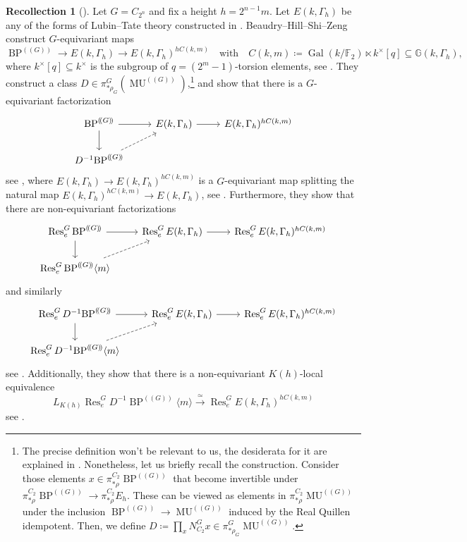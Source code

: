 \documentclass[a4paper, 10pt]{article}
\newcommand{\F}{\mathbb F}
\newcommand{\MU}{\operatorname{MU}}
\newcommand{\MUG}{{\MU^{(\!(G)\!)}}}
\newcommand{\BPG}{{\BP^{(\!(G)\!)}}}
\newcommand{\BPGm}{{\BP^{(\!(G)\!)}}\langle m\rangle}
\newcommand{\BP}{\operatorname{BP}}
\newcommand{\Res}{\operatorname{Res}}
\theoremstyle{definition}
\newtheorem{recollection}[recollection]{Recollection}
\begin{document}
\begin{recollection}[{\cite{beaudryHillShiZeng2021modelsLubinTate}}] \label{recollection: bhsz}
    Let \(G=C_{2^n}\) and fix a height \(h=2^{n-1}m\).
    Let \(E(k,\Gamma_h)\) be any of the forms of Lubin--Tate theory constructed in \cite[Theorem 1.5]{beaudryHillShiZeng2021modelsLubinTate}.
    Beaudry--Hill--Shi--Zeng construct \(G\)-equivariant maps
    \[\BPG\longrightarrow E(k,\Gamma_h)\longrightarrow E(k,\Gamma_h)^{hC(k,m)} \quad \text{with} \quad C(k,m) \coloneqq \operatorname{Gal}(k/\F_2) \ltimes k^\times [q] \subseteq \mathbb{G}(k, \Gamma_h),
    \]
    where $k^{\times}[q] \subseteq k^{\times}$ is the subgroup of $q = (2^m-1)$-torsion elements, see \cite[Remark 6.1]{beaudryHillShiZeng2021modelsLubinTate}.
    They construct a class \(D\in \pi^{G}_{*\rho_G}(\MUG)\),\footnote{The precise definition won't be relevant to us, the desiderata for it are explained in \cite[Section 6]{beaudryHillShiZeng2021modelsLubinTate}. Nonetheless, let us briefly recall the construction. Consider those elements $x \in \pi_{*\rho}^{C_2} \BPG$ that become invertible under $\pi_{*\rho}^{C_2}\BPG \to \pi_{*\rho}^{C_2} E_h$. These can be viewed as elements in $\pi_{*\rho}^{C_2} \MUG$ under the inclusion $\BPG \to \MUG$ induced by the Real Quillen idempotent. Then, we define $D \coloneqq \prod_x N_{C_2}^G x \in \pi_{*\rho_G}^G \MUG$.} and show that there is a
    \(G\)-equivariant factorization
    \[
    \begin{tikzcd}
        \BPG \ar[r]\ar[d] & E(k,\Gamma_h) \ar[r] & E(k,\Gamma_h)^{hC(k,m)} \\
        D^{-1}\BPG \ar[ru, dashed]
    \end{tikzcd}
    \]
    see \cite[Theorem 1.8]{beaudryHillShiZeng2021modelsLubinTate}, where $E(k,\Gamma_h) \to E(k,\Gamma_h)^{hC(k,m)}$ is a $G$-equivariant map splitting the natural map $E(k, \Gamma_h)^{hC(k,m)} \to E(k,\Gamma_h)$, see \cite[Theorem 5.3]{beaudryHillShiZeng2021modelsLubinTate}.
    Furthermore, they show that there are non-equivariant factorizations
    \[
    \begin{tikzcd}
        \Res^G_{e}\BPG \ar[r]\ar[d] & \Res^G_{e}E(k,\Gamma_h) \ar[r] & \Res^G_{e}E(k,\Gamma_h)^{hC(k,m)} \\
        \Res^G_{e}\BPGm \ar[ru, dashed]
    \end{tikzcd}
    \]
    and similarly
    \[
    \begin{tikzcd}
        \Res^G_{e}D^{-1}\BPG \ar[r]\ar[d] & \Res^G_{e}E(k,\Gamma_h) \ar[r] & \Res^G_{e}E(k,\Gamma_h)^{hC(k,m)} \\
        \Res^G_{e}D^{-1}\BPGm \ar[ru, dashed]
    \end{tikzcd}
    \]
    see \cite[Proposition 7.6]{beaudryHillShiZeng2021modelsLubinTate}. Additionally, they show that there is a non-equivariant \(K(h)\)-local equivalence 
    \[
    L_{K(h)}\Res^G_{e}D^{-1}\BPGm \xrightarrow{\ \simeq \ } \Res^G_{e}E(k,\Gamma_h)^{hC(k,m)}
    \]
    see \cite[Proposition 7.6]{beaudryHillShiZeng2021modelsLubinTate}.
\end{recollection}
\end{document}

